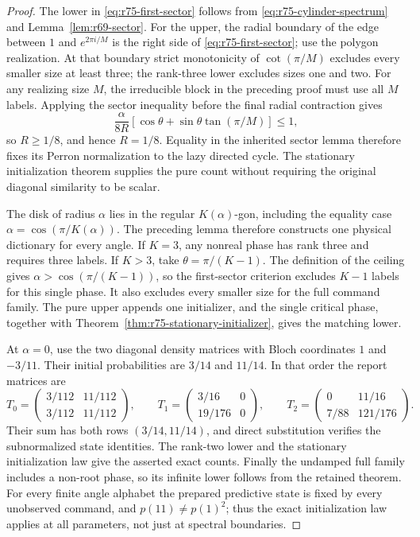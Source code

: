 \begin{proof}
The lower in \eqref{eq:r75-first-sector} follows from
\eqref{eq:r75-cylinder-spectrum} and Lemma~\ref{lem:r69-sector}.
For the upper, the radial boundary of the edge between $1$ and
$e^{2\pi i/M}$ is the right side of
\eqref{eq:r75-first-sector}; use the polygon realization.  At that
boundary strict monotonicity of $\cot(\pi/M)$ excludes every smaller
size at least three; the rank-three lower excludes sizes one and two.
For any realizing size $M$, the irreducible block in the preceding
proof must use all $M$ labels.  Applying the sector inequality before
the final radial contraction gives
\[
 \frac{\alpha}{8R}
  [\cos\theta+\sin\theta\tan(\pi/M)]\le1,
\]
so $R\ge1/8$, and hence $R=1/8$.  Equality in the inherited sector lemma
therefore fixes its Perron normalization to the lazy directed cycle.
The stationary initialization theorem supplies the pure count without
requiring the original diagonal similarity to be scalar.

The disk of radius $\alpha$ lies in the regular $K(\alpha)$-gon, including
the equality case $\alpha=\cos(\pi/K(\alpha))$.  The preceding lemma
therefore constructs one physical dictionary for every angle.  If
$K=3$, any nonreal phase has rank three and requires three labels.  If
$K>3$, take $\theta=\pi/(K-1)$.  The definition of the ceiling gives
$\alpha>\cos(\pi/(K-1))$, so the first-sector criterion excludes
$K-1$ labels for this single phase.  It also excludes every smaller size
for the full command family.  The pure upper appends one initializer,
and the single critical phase, together with
Theorem~\ref{thm:r75-stationary-initializer}, gives the matching lower.

At $\alpha=0$, use the two diagonal density matrices with Bloch
coordinates $1$ and $-3/11$.  Their initial probabilities are $3/14$ and
$11/14$.  In that order the report matrices are
\begin{equation}\label{eq:r75-zero-damping-tables}
 T_0=\begin{pmatrix}3/112&11/112\\3/112&11/112\end{pmatrix},\qquad
 T_1=\begin{pmatrix}3/16&0\\19/176&0\end{pmatrix},\qquad
 T_2=\begin{pmatrix}0&11/16\\7/88&121/176\end{pmatrix}.
\end{equation}
Their sum has both rows $(3/14,11/14)$, and direct substitution verifies
the subnormalized state identities.  The rank-two lower and the
stationary initialization law give the asserted exact counts.
Finally the undamped full family includes a non-root phase, so its
infinite lower follows from the retained theorem.  For every finite
angle alphabet the prepared predictive state is fixed by every
unobserved command, and $p(11)\ne p(1)^2$; thus the exact initialization
law applies at all parameters, not just at spectral boundaries.
\end{proof}


